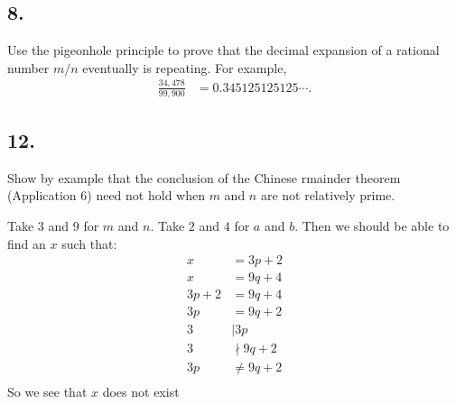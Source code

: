 \documentclass{article}
\begin{document}
\subsection*{8.}
Use the pigeonhole principle to prove that the decimal expansion of a rational number $m/n$ eventually is repeating. For example,
\begin{align*}
  \frac{34,478}{99,900}&=0.345125125125\cdots.
\end{align*}
\subsection*{12.}
Show by example that the conclusion of the Chinese rmainder theorem (Application 6) need not hold when $m$ and $n$ are not relatively prime.

Take 3 and 9 for $m$ and $n$. Take $2$ and $4$ for $a$ and $b$. Then we should be able to find an $x$ such that:
\begin{align*}
  x&=3p+2\\
  x&=9q+4\\
  3p+2&=9q+4\\
  3p&=9q+2\\
  3&\mid 3p\\
  3&\nmid 9q+2\\
  3p&\neq9q+2\\
\end{align*}
So we see that $x$ does not exist
\end{document}
